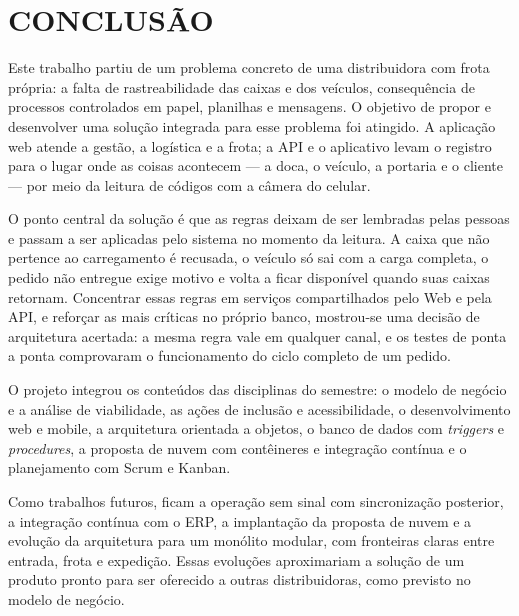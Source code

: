 \chapter{CONCLUSÃO}

Este trabalho partiu de um problema concreto de uma distribuidora com frota própria: a falta de rastreabilidade das caixas e dos veículos, consequência de processos controlados em papel, planilhas e mensagens. O objetivo de propor e desenvolver uma solução integrada para esse problema foi atingido. A aplicação web atende a gestão, a logística e a frota; a API e o aplicativo levam o registro para o lugar onde as coisas acontecem --- a doca, o veículo, a portaria e o cliente --- por meio da leitura de códigos com a câmera do celular.

O ponto central da solução é que as regras deixam de ser lembradas pelas pessoas e passam a ser aplicadas pelo sistema no momento da leitura. A caixa que não pertence ao carregamento é recusada, o veículo só sai com a carga completa, o pedido não entregue exige motivo e volta a ficar disponível quando suas caixas retornam. Concentrar essas regras em serviços compartilhados pelo Web e pela API, e reforçar as mais críticas no próprio banco, mostrou-se uma decisão de arquitetura acertada: a mesma regra vale em qualquer canal, e os testes de ponta a ponta comprovaram o funcionamento do ciclo completo de um pedido.

O projeto integrou os conteúdos das disciplinas do semestre: o modelo de negócio e a análise de viabilidade, as ações de inclusão e acessibilidade, o desenvolvimento web e mobile, a arquitetura orientada a objetos, o banco de dados com \textit{triggers} e \textit{procedures}, a proposta de nuvem com contêineres e integração contínua e o planejamento com Scrum e Kanban.

Como trabalhos futuros, ficam a operação sem sinal com sincronização posterior, a integração contínua com o ERP, a implantação da proposta de nuvem e a evolução da arquitetura para um monólito modular, com fronteiras claras entre entrada, frota e expedição. Essas evoluções aproximariam a solução de um produto pronto para ser oferecido a outras distribuidoras, como previsto no modelo de negócio.
